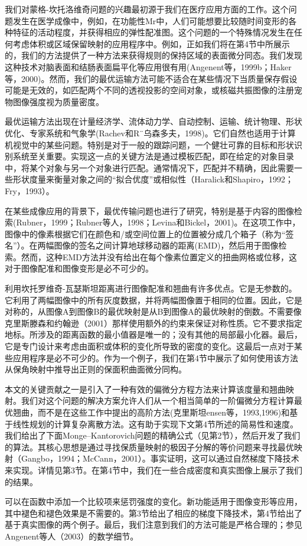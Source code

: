 我们对蒙格-坎托洛维奇问题的兴趣最初源于我们在医疗应用方面的工作。这个问题发生在医学成像中，例如，在功能性Mr中，人们可能想要比较随时间变形的各种特征的活动程度，并获得相应的弹性配准图。这个问题的一个特殊情况发生在任何考虑体积或区域保留映射的应用程序中。例如，正如我们将在第4节中所展示的，我们的方法提供了一种方法来获得规则的保持区域的表面微分同态。我们发现这种技术对脑表面和结肠表面扁平化等应用很有用(Angenent等，1999b；Haker等，2000)。然而，我们的最优运输方法可能不适合在某些情况下当质量保存假设可能是无效的，如匹配两个不同的透视投影的空间对象，或核磁共振图像的注册宠物图像强度视为质量密度。

最优运输方法出现在计量经济学、流体动力学、自动控制、运输、统计物理、形状优化、专家系统和气象学(Rachev和R¨乌森多夫，1998)。它们自然也适用于计算机视觉中的某些问题。特别是对于一般的跟踪问题，一个健壮可靠的目标和形状识别系统至关重要。实现这一点的关键方法是通过模板匹配，即在给定的对象目录中，将某个对象与另一个对象进行匹配。通常情况下，匹配并不精确，因此需要一些形状度量来衡量对象之间的“拟合优度”或相似性（Haralick和Shapiro，1992；Fry，1993）。

在某些成像应用的背景下，最优传输问题也进行了研究，特别是基于内容的图像检索(Rubner，1999；Rubner等人，1998；Levina和Bickel，2001)。在这项工作中，图像中的像素根据它们在颜色和/或空间位置上的位置被分成几个箱子（称为“签名”）。在两幅图像的签名之间计算地球移动器的距离(EMD)，然后用于图像检索。然而，这种EMD方法并没有给出在每个像素位置定义的扭曲网格或位移，这对于图像配准和图像变形是必不可少的。

利用坎托罗维奇-瓦瑟斯坦距离进行图像配准和翘曲有许多优点。它是无参数的。它利用了两幅图像中的所有灰度数据，并将两幅图像置于相同的位置。因此，它是对称的，从图像A到图像B的最优映射是从B到图像A的最优映射的倒数。不需要像克里斯滕森和约翰逊（2001）那样使用额外的约束来保证对称性质。它不要求指定地标。所涉及的距离函数的最小值器是唯一的；没有其他的局部最小化器。最后，它是专门设计来考虑由面积或体积的变化所导致的密度的变化。这最后一点对于某些应用程序是必不可少的。作为一个例子，我们在第4节中展示了如何使用该方法从保角映射中推导出正则的保面积曲面微分同构。

本文的关键贡献之一是引入了一种有效的偏微分方程方法来计算该度量和翘曲映射。我们对这个问题的解决方案允许人们从一个相当简单的一阶偏微分方程计算最优翘曲，而不是在这些工作中提出的高阶方法(克里斯坦ensen等，1993,1996)和基于线性规划的计算复杂离散方法。这有助于实现下文第4节所述的简易性和速度。我们给出了下面Monge–Kantorovich问题的精确公式（见第2节），然后开发了我们的算法。其核心思想是通过寻找保质量映射的极因子分解的等价问题来寻找最优映射（Gangbo，1994；McCann，2001）。事实证明，这可以通过自然梯度下降技术来实现。详情见第3节。在第4节中，我们在一些合成密度和真实图像上展示了我们的结果。

可以在函数中添加一个比较项来惩罚强度的变化。新功能适用于图像变形等应用，其中褪色和褪色效果是不需要的。第3节给出了相应的梯度下降技术，第4节给出了基于真实图像的两个例子。最后，我们注意到我们的方法可能是严格合理的；参见Angenent等人（2003）的数学细节。
